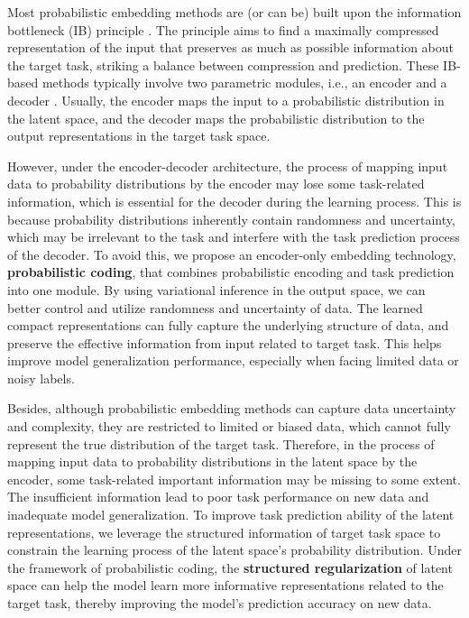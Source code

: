 \documentclass[letterpaper]{article} %
\begin{document}
Most probabilistic embedding methods \cite{DBLP:journals/corr/KingmaW13,DBLP:conf/iclr/AlemiFD017, DBLP:conf/iclr/HigginsMPBGBML17,DBLP:journals/entropy/Fischer20,DBLP:conf/cvpr/AnJC23} are (or can be) built upon the information bottleneck (IB) principle \cite{tishby1999information,tishby2015deep}.
The principle aims to find a maximally compressed representation of the input that preserves as much as possible information about the target task, striking a balance between compression and prediction.
These IB-based methods typically involve two parametric modules, i.e., an encoder and a decoder \cite{DBLP:journals/jsait/GoldfeldP20}.
Usually, the encoder maps the input to a probabilistic distribution in the latent space, and the decoder maps the probabilistic distribution to the output representations in the target task space.


However, under the encoder-decoder architecture, the process of mapping input data to probability distributions by the encoder may lose some task-related information, which is essential for the decoder during the learning process. This is because probability distributions inherently contain randomness and uncertainty, which may be irrelevant to the task and interfere with the task prediction process of the decoder.
To avoid this, we propose an encoder-only embedding technology, \textbf{probabilistic coding}, that combines probabilistic encoding and task prediction into one module.
By using variational inference in the output space, we can better control and utilize randomness and uncertainty of data.
The learned compact representations can fully capture the underlying structure of data, and preserve the effective information from input related to target task.
This helps improve model generalization performance, especially when facing limited data or noisy labels.


Besides, although probabilistic embedding methods can capture data uncertainty and complexity, they are restricted to limited or biased data, which cannot fully represent the true distribution of the target task. Therefore, in the process of mapping input data to probability distributions in the latent space by the encoder, some task-related important information may be missing to some extent.
The insufficient information lead to poor task performance on new data and  inadequate model generalization.
To improve task prediction ability of the latent representations,
we leverage the structured information of target task space to
constrain the learning process of the latent space's probability distribution.
Under the framework of probabilistic coding, the \textbf{structured regularization} of latent space can help the model learn more informative representations related to the target task, thereby improving the model's prediction accuracy on new data.
\end{document}
